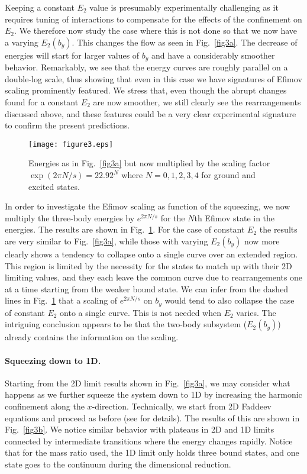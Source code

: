 \documentclass[twocolumn,showpacs,aps,prl,10pt]{revtex4}
\begin{document}
Keeping a constant $E_2$ value is presumably experimentally challenging
as it requires tuning of interactions to compensate for the effects of
the confinement on $E_2$. We therefore now study the case where this
is not done so that we now have a varying $E_{2}(b_y)$.  This changes
the flow as seen in Fig.~\ref{fig3a}.  The decrease of energies will
start for larger values of $b_y$ and have a considerably smoother
behavior.  Remarkably, we see that the energy curves are roughly
parallel on a double-log scale, thus showing that even in this case we
have signatures of Efimov scaling prominently featured.  We stress
that, even though the abrupt changes found for a constant $E_2$ are
now smoother, we still clearly see the rearrangements discussed above,
and these features could be a very clear experimental signature to
confirm the present predictions.

\begin{figure}[ht!]
\texttt{[image: figure3.eps]}
\caption{
Energies as in Fig.~\ref{fig3a} but now multiplied by
the scaling factor $\exp(2\pi N/s) = 22.92^N$ where $N=0,1,2,3,4$
for ground and excited states.}
\label{fig3c}
\end{figure}


In order to investigate the Efimov scaling as function of the
squeezing, we now multiply the three-body energies by $e^{2\pi N/s}$
for the $N$th Efimov state in the energies.  The results are shown in
Fig.~\ref{fig3c}.  For the case of constant $E_2$ the results are very
similar to Fig.~\ref{fig3a}, while those with varying $E_2(b_y)$ now
more clearly shows a tendency to collapse onto a single curve over an
extended region. This region is limited by the necessity for the
states to match up with their 2D limiting values, and they each leave
the common curve due to rearrangements one at a time starting from the
weaker bound state.  We can infer from the dashed lines in
Fig.~\ref{fig3c} that a scaling of $e^{2\pi N/s}$ on $b_y$ would tend
to also collapse the case of constant $E_2$ onto a single curve. This
is not needed when $E_2$ varies. The intriguing conclusion appears to be
that the two-body subsystem ($E_2(b_y)$) already contains the information on the scaling.


\paragraph*{Squeezing down to 1D.}
Starting from the 2D limit results shown in Fig.~\ref{fig3a}, we may
consider what happens as we further squeeze the system down to 1D by
increasing the harmonic confinement along the $x$-direction.  
Technically, we start from 2D Faddeev
equations and proceed as before (see \cite{supmat} for details).
The results of this are shown in Fig.~\ref{fig3b}.  We notice similar
behavior with plateaus in 2D and 1D limits connected by intermediate
transitions where the energy changes rapidly. Notice that for the mass
ratio used, the 1D limit only holds three bound states, and one state
goes to the continuum during the dimensional reduction.
\end{document}
